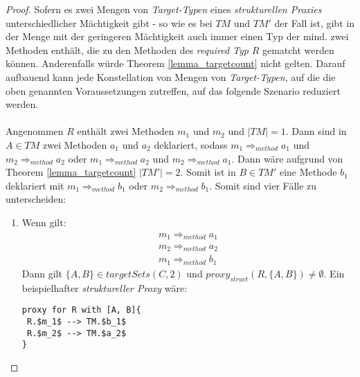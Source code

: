 \begin{proof}
Sofern es zwei Mengen von \emph{Target-Typen} eines \emph{strukturellen Proxies} unterschiedlicher Mächtigkeit gibt - so wie es bei $\mathit{TM}$ und $\mathit{TM'}$ der Fall ist, gibt in der Menge mit der geringeren Mächtigkeit auch immer einen Typ der mind. zwei Methoden enthält, die zu den Methoden des \emph{required Typ} $R$ gematcht werden können. Anderenfalls würde Theorem \ref{lemma_targetcount} nicht gelten.
Darauf aufbauend kann jede Konstellation von Mengen von \emph{Target-Typen}, auf die die oben genannten Voraussetzungen zutreffen, auf das folgende Szenario reduziert werden.
\\\\
Angenommen $R$ enthält zwei Methoden $m_1$ und $m_2$ und $|\mathit{TM}| = 1$.
Dann sind in $A \in \mathit{TM}$ zwei Methoden $a_1$ und $a_2$ deklariert, sodass $m_1 \Rightarrow_{method} a_1$ und $m_2 \Rightarrow_{method} a_2$ oder $m_1 \Rightarrow_{method} a_2$ und $m_2 \Rightarrow_{method} a_1$. Dann wäre aufgrund von Theorem \ref{lemma_targetcount} $|\mathit{TM'}| = 2$. Somit ist in $B \in \mathit{TM'}$ eine Methode $b_1$ deklariert mit $m_1 \Rightarrow_{method} b_1$ oder $m_2 \Rightarrow_{method} b_1$.
Somit sind vier Fälle zu unterscheiden:
\begin{enumerate}
\item 
Wenn gilt: 
\begin{gather*}
m_1 \Rightarrow_{method} a_1 \\
m_2 \Rightarrow_{method} a_2 \\
m_1 \Rightarrow_{method} b_1
\end{gather*}
Dann gilt $\{A, B\} \in \mathit{targetSets(C,2)}$ und $\mathit{proxy_{struct}(R,\{A, B\})} \neq \emptyset$.
Ein beispielhafter \emph{struktureller Proxy} wäre:
\begin{lstlisting}[mathescape, style=dsl]
proxy for R with [A, B]{
 R.$m_1$ --> TM.$b_1$
 R.$m_2$ --> TM.$a_2$
}
\end{lstlisting}


\end{enumerate}
\end{proof}
